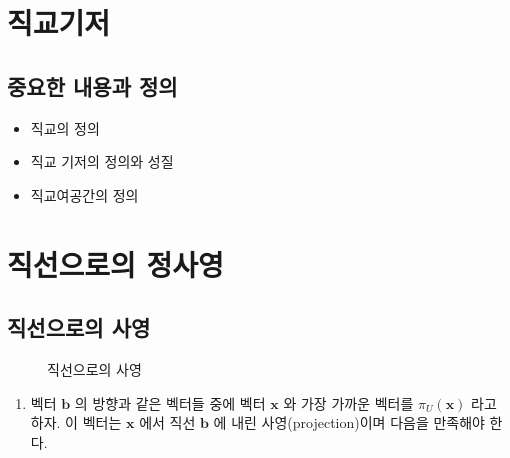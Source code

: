 \documentclass[
  11pt,
  a4paper,
  oneside]{scrbook}
\providecommand{\tightlist}{%
  \setlength{\itemsep}{0pt}\setlength{\parskip}{0pt}}\usepackage{longtable,booktabs,array}
\theoremstyle{definition}
\theoremstyle{definition}
\theoremstyle{plain}
\theoremstyle{remark}
\begin{document}

\chapter{직교기저}\label{ortho_normal_base}

\section{중요한 내용과
정의}\label{uxc911uxc694uxd55c-uxb0b4uxc6a9uxacfc-uxc815uxc758-8}

\begin{itemize}
\tightlist
\item
  직교의 정의
\item
  직교 기저의 정의와 성질
\item
  직교여공간의 정의
\end{itemize}


\chapter{직선으로의 정사영}\label{projection_1}

\section{직선으로의
사영}\label{uxc9c1uxc120uxc73cuxb85cuxc758-uxc0acuxc601}

\begin{figure}


\caption{\label{fig-projection-line}직선으로의 사영}

\end{figure}%

\begin{enumerate}
\def\labelenumi{\arabic{enumi}.}
\tightlist
\item
  벡터 \(\pmb b\) 의 방향과 같은 벡터들 중에 벡터 \(\pmb x\) 와 가장
  가까운 벡터를 \(\pi_U(\pmb x)\) 라고 하자. 이 벡터는 \(\pmb x\) 에서
  직선 \(\pmb b\) 에 내린 사영(projection)이며 다음을 만족해야 한다.
\end{enumerate}
\end{document}
